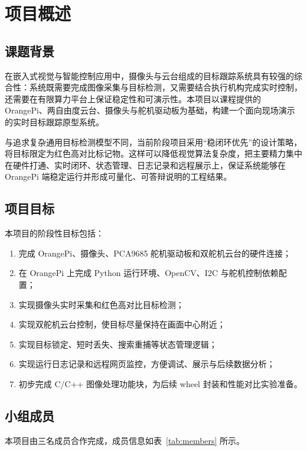 \chapter{项目概述}

\section{课题背景}

在嵌入式视觉与智能控制应用中，摄像头与云台组成的目标跟踪系统具有较强的综合性：系统既需要完成图像采集与目标检测，又需要结合执行机构完成实时控制，还需要在有限算力平台上保证稳定性和可演示性。本项目以课程提供的 OrangePi、两自由度云台、摄像头与舵机驱动板为基础，构建一个面向现场演示的实时目标跟踪原型系统。

与追求复杂通用目标检测模型不同，当前阶段项目采用“稳闭环优先”的设计策略，将目标限定为红色高对比标记物。这样可以降低视觉算法复杂度，把主要精力集中在硬件打通、实时闭环、状态管理、日志记录和远程展示上，保证系统能够在 OrangePi 端稳定运行并形成可量化、可答辩说明的工程结果。

\section{项目目标}

本项目的阶段性目标包括：

\begin{enumerate}
  \item 完成 OrangePi、摄像头、PCA9685 舵机驱动板和双舵机云台的硬件连接；
  \item 在 OrangePi 上完成 Python 运行环境、OpenCV、I2C 与舵机控制依赖配置；
  \item 实现摄像头实时采集和红色高对比目标检测；
  \item 实现双舵机云台控制，使目标尽量保持在画面中心附近；
  \item 实现目标锁定、短时丢失、搜索重捕等状态管理逻辑；
  \item 实现运行日志记录和远程网页监控，方便调试、展示与后续数据分析；
  \item 初步完成 C/C++ 图像处理功能块，为后续 wheel 封装和性能对比实验准备。
\end{enumerate}

\section{小组成员}

本项目由三名成员合作完成，成员信息如表~\ref{tab:members} 所示。

